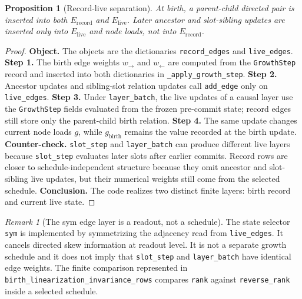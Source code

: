 \documentclass[11pt]{article}
\newtheorem{proposition}[definition]{Proposition}
\theoremstyle{remark}
\newtheorem{remark}[definition]{Remark}
\newcommand{\code}[1]{\texttt{#1}}
\numberwithin{equation}{section}
\begin{document}
\begin{proposition}[Record-live separation]
At birth, a parent-child directed pair is inserted into both \(E_{\mathrm{record}}\) and \(E_{\mathrm{live}}\). Later ancestor and slot-sibling updates are inserted only into \(E_{\mathrm{live}}\) and node loads, not into \(E_{\mathrm{record}}\).
\end{proposition}
\begin{proof}
\textbf{Object.} The objects are the dictionaries \code{record\_\allowbreak{}edges} and \code{live\_\allowbreak{}edges}. \textbf{Step 1.} The birth edge weights \(w_{\rightarrow}\) and \(w_{\leftarrow}\) are computed from the \code{GrowthStep} record and inserted into both dictionaries in \code{\_apply\_\allowbreak{}growth\_\allowbreak{}step}. \textbf{Step 2.} Ancestor updates and sibling-slot relation updates call \code{add\_\allowbreak{}edge} only on \code{live\_\allowbreak{}edges}. \textbf{Step 3.} Under \code{layer\_\allowbreak{}batch}, the live updates of a causal layer use the \code{GrowthStep} fields evaluated from the frozen pre-commit state; record edges still store only the parent-child birth relation. \textbf{Step 4.} The same update changes current node loads \(g\), while \(g_{\mathrm{birth}}\) remains the value recorded at the birth update. \textbf{Counter-check.} \code{slot\_\allowbreak{}step} and \code{layer\_\allowbreak{}batch} can produce different live layers because \code{slot\_\allowbreak{}step} evaluates later slots after earlier commits. Record rows are closer to schedule-independent structure because they omit ancestor and slot-sibling live updates, but their numerical weights still come from the selected schedule. \textbf{Conclusion.} The code realizes two distinct finite layers: birth record and current live state.
\end{proof}

\begin{remark}[The sym edge layer is a readout, not a schedule]
The state selector \code{sym} is implemented by symmetrizing the adjacency read from \code{live\_\allowbreak{}edges}. It cancels directed skew information at readout level. It is not a separate growth schedule and it does not imply that \code{slot\_\allowbreak{}step} and \code{layer\_\allowbreak{}batch} have identical edge weights. The finite comparison represented in \code{birth\_\allowbreak{}linearization\_\allowbreak{}invariance\_\allowbreak{}rows} compares \code{rank} against \code{reverse\_\allowbreak{}rank} inside a selected schedule.
\end{remark}
\end{document}
